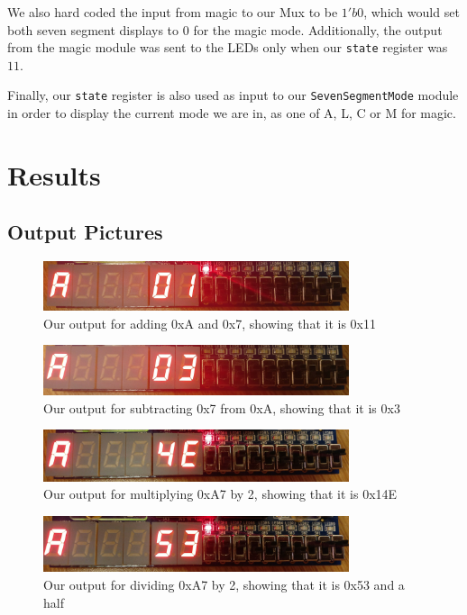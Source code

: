 \documentclass[11pt]{article}
\begin{document}
We also hard coded the input from magic to our Mux to be $1'b0$, which would set both seven segment displays to 0 for the magic mode. Additionally, the output from the magic module was sent to the LEDs only when our \texttt{state} register was $11$.

Finally, our \texttt{state} register is also used as input to our \texttt{SevenSegmentMode} module in order to display the current mode we are in, as one of A, L, C or M for magic.

\section{Results}
\subsection{Output Pictures}
\begin{figure}[H]
    \centering
    \includegraphics[width=0.8\textwidth]{Ar1}
    \caption{Our output for adding 0xA and 0x7, showing that it is 0x11}
\end{figure}
\begin{figure}[H]
    \centering
    \includegraphics[width=0.8\textwidth]{Ar2}
    \caption{Our output for subtracting 0x7 from 0xA, showing that it is 0x3}
\end{figure}
\begin{figure}[H]
    \centering
    \includegraphics[width=0.8\textwidth]{Ar3}
    \caption{Our output for multiplying 0xA7 by 2, showing that it is 0x14E}
\end{figure}
\begin{figure}[H]
    \centering
    \includegraphics[width=0.8\textwidth]{Ar4}
    \caption{Our output for dividing 0xA7 by 2, showing that it is 0x53 and a half}
\end{figure}
\end{document}
